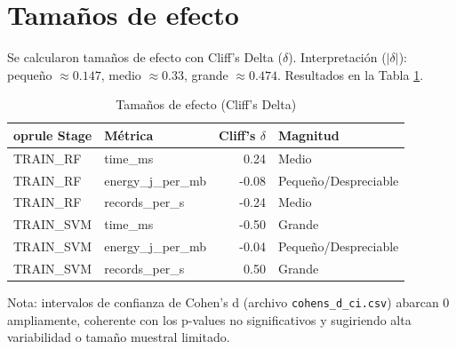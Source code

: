 \documentclass[12pt,oneside]{report}
\begin{document}
    \section{Tamaños de efecto}
    Se calcularon tamaños de efecto con Cliff's Delta (\(\delta\)). Interpretación (\(|\delta|\)): pequeño \(\approx 0.147\), medio \(\approx 0.33\), grande \(\approx 0.474\). Resultados en la Tabla \ref{tab:cliffs}.
    \begin{table}[htbp]
    \centering
    \caption{Tamaños de efecto (Cliff's Delta)}
    \label{tab:cliffs}
    \begin{tabular}{l l r l}
    	oprule
    Stage & Métrica & Cliff's \(\delta\) & Magnitud \\
    \midrule
    TRAIN\_RF & time\_ms & 0.24 & Medio \\
    TRAIN\_RF & energy\_j\_per\_mb & -0.08 & Pequeño/Despreciable \\
    TRAIN\_RF & records\_per\_s & -0.24 & Medio \\
    TRAIN\_SVM & time\_ms & -0.50 & Grande \\
    TRAIN\_SVM & energy\_j\_per\_mb & -0.04 & Pequeño/Despreciable \\
    TRAIN\_SVM & records\_per\_s & 0.50 & Grande \\
    \bottomrule
    \end{tabular}
    \end{table}
    Nota: intervalos de confianza de Cohen's d (archivo \texttt{cohens\_d\_ci.csv}) abarcan 0 ampliamente, coherente con los p-values no significativos y sugiriendo alta variabilidad o tamaño muestral limitado.
\end{document}
